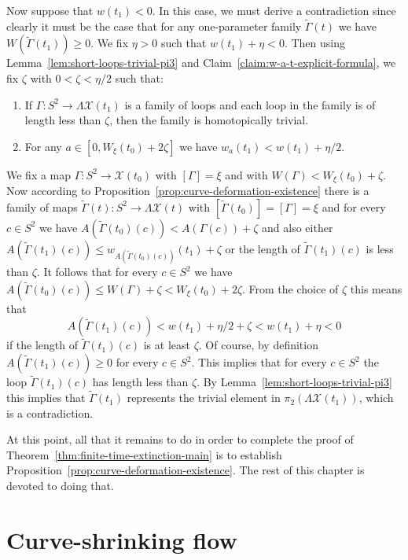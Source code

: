Now suppose that $w(t_1)<0$. In this case, we must derive a contradiction since
clearly it must be the case that for any one-parameter family
$\widetilde\Gamma(t)$ we have $W(\widetilde\Gamma(t_1))\ge 0$. We fix $\eta>0$
such that $w(t_1)+\eta<0$. Then using Lemma~\ref{lem:short-loops-trivial-pi3} and
Claim~\ref{claim:w-a-t-explicit-formula}, we fix $\zeta$ with $0<\zeta<\eta/2$ such that:
\begin{enumerate}
\item[(i)] If $\Gamma\colon S^2\to \Lambda {\mathcal X}(t_1)$ is a family
of loops and each loop in the family is of length less than $\zeta$,
then the family is homotopically trivial.
\item[(ii)] For any $a\in [0,W_\xi(t_0)+2\zeta]$ we have $w_a(t_1)<w(t_1)+\eta/2$.
\end{enumerate}

We fix a map $\Gamma\colon S^2\to {\mathcal X}(t_0)$ with
$[\Gamma]=\xi$ and with $W(\Gamma)<W_\xi(t_0)+\zeta$. Now according
to Proposition~\ref{prop:curve-deformation-existence} there is a family of maps
$\widetilde\Gamma(t)\colon S^2\to \Lambda{\mathcal X}(t)$ with
$[\widetilde\Gamma(t_0)]=[\Gamma]=\xi$ and for every $c\in S^2$ we
have $A(\widetilde\Gamma(t_0)(c))<A(\Gamma(c))+\zeta$ and also
either $A(\widetilde\Gamma(t_1)(c))\le
w_{A(\widetilde\Gamma(t_0)(c))}(t_1)+\zeta$ or the length of
$\widetilde\Gamma(t_1)(c)$ is less than $\zeta$. It follows that for
every $c\in S^2$ we have $A(\widetilde\Gamma(t_0)(c))\le
W(\Gamma)+\zeta<W_\xi(t_0)+2\zeta$. From the choice of $\zeta$ this
means that
$$A(\widetilde\Gamma(t_1)(c))< w(t_1)+\eta/2+\zeta<w(t_1)+\eta<0$$ if
the length of $\widetilde\Gamma(t_1)(c)$ is at least $\zeta$. Of course, by
definition $A(\widetilde\Gamma(t_1)(c))\ge 0$ for every $c\in S^2$. This
implies  that for every $c\in S^2$ the loop $\widetilde\Gamma(t_1)(c)$ has
length less than $\zeta$. By Lemma~\ref{lem:short-loops-trivial-pi3} this implies that
$\widetilde\Gamma(t_1)$ represents the trivial element in
$\pi_2(\Lambda{\mathcal X}(t_1))$, which is a contradiction.

At this point, all that it remains to do in order to complete the
proof of Theorem~\ref{thm:finite-time-extinction-main} is to establish Proposition~\ref{prop:curve-deformation-existence}.
The rest of this chapter is devoted to doing that.






\section{Curve-shrinking flow}\label{sect:csf}

